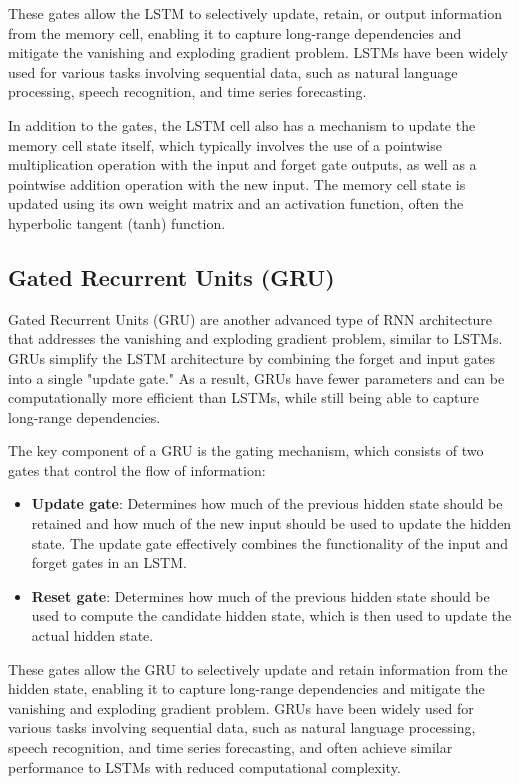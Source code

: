 \documentclass[12pt]{article}
\begin{document}
These gates allow the LSTM to selectively update, retain, or output information from the memory cell, enabling it to capture long-range dependencies and mitigate the vanishing and exploding gradient problem. LSTMs have been widely used for various tasks involving sequential data, such as natural language processing, speech recognition, and time series forecasting.

In addition to the gates, the LSTM cell also has a mechanism to update the memory cell state itself, which typically involves the use of a pointwise multiplication operation with the input and forget gate outputs, as well as a pointwise addition operation with the new input. The memory cell state is updated using its own weight matrix and an activation function, often the hyperbolic tangent (tanh) function.

\subsection{Gated Recurrent Units (GRU)}

Gated Recurrent Units (GRU) are another advanced type of RNN architecture that addresses the vanishing and exploding gradient problem, similar to LSTMs. GRUs simplify the LSTM architecture by combining the forget and input gates into a single "update gate." As a result, GRUs have fewer parameters and can be computationally more efficient than LSTMs, while still being able to capture long-range dependencies.

The key component of a GRU is the gating mechanism, which consists of two gates that control the flow of information:

\begin{itemize}
\item \textbf{Update gate}: Determines how much of the previous hidden state should be retained and how much of the new input should be used to update the hidden state. The update gate effectively combines the functionality of the input and forget gates in an LSTM.
\item \textbf{Reset gate}: Determines how much of the previous hidden state should be used to compute the candidate hidden state, which is then used to update the actual hidden state.
\end{itemize}
These gates allow the GRU to selectively update and retain information from the hidden state, enabling it to capture long-range dependencies and mitigate the vanishing and exploding gradient problem. GRUs have been widely used for various tasks involving sequential data, such as natural language processing, speech recognition, and time series forecasting, and often achieve similar performance to LSTMs with reduced computational complexity.
\end{document}
